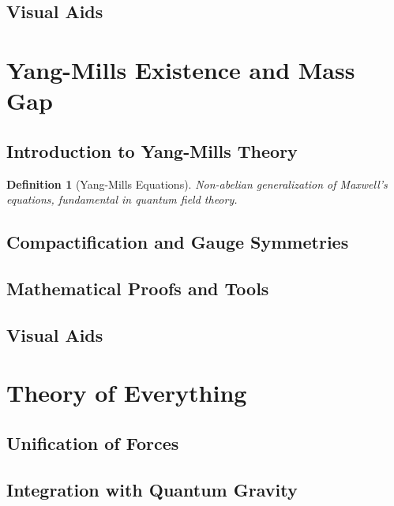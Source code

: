 \documentclass[12pt, a4paper]{article}
\theoremstyle{definitionstyle}
\newtheorem{definition}[theorem]{Definition}
\begin{document}
\subsection{Visual Aids}

\section{Yang-Mills Existence and Mass Gap}
\subsection{Introduction to Yang-Mills Theory}
\begin{definition}[Yang-Mills Equations]
Non-abelian generalization of Maxwell's equations, fundamental in quantum field theory.
\end{definition}

\subsection{Compactification and Gauge Symmetries}

\subsection{Mathematical Proofs and Tools}

\subsection{Visual Aids}

\section{Theory of Everything}
\subsection{Unification of Forces}

\subsection{Integration with Quantum Gravity}
\end{document}
